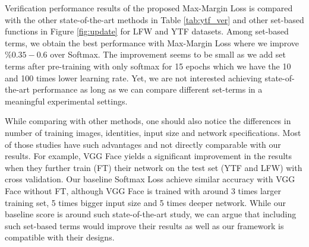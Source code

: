 \documentclass[10pt,twocolumn,letterpaper]{article}
\newcommand{\margin}{Max-Margin Loss\xspace}
\begin{document}
Verification performance results of the proposed \margin is compared with the other state-of-the-art methods in Table \ref{tab:ytf_ver} and other set-based functions in Figure \ref{fig:update} for LFW and YTF datasets. Among set-based terms, we obtain the best performance with \margin where we improve $\%0.35-0.6$ over Softmax. The improvement seems to be small as we add set terms after pre-training with only softmax for 15 epochs which we have the 10 and 100 times lower learning rate. Yet, we are not interested achieving state-of-the-art performance as long as we can compare different set-terms in a meaningful experimental settings.

While comparing with other methods, one should also notice the differences in number of training images, identities, input size and network specifications. Most of those studies have such advantages and not directly comparable with our results. For example, VGG Face\cite{parkhi2015deep} yields a significant improvement in the results when they further train (FT) their network on the test set (YTF and LFW) with cross validation. Our baseline Softmax Loss achieve similar accuracy with VGG Face\cite{parkhi2015deep} without FT, although VGG Face is trained with around 3 times larger training set, 5 times bigger input size and 5 times deeper network. While our baseline score is around such state-of-the-art study, we can argue that including such set-based terms would improve their results as well as our framework is compatible with their designs.




\end{document}
